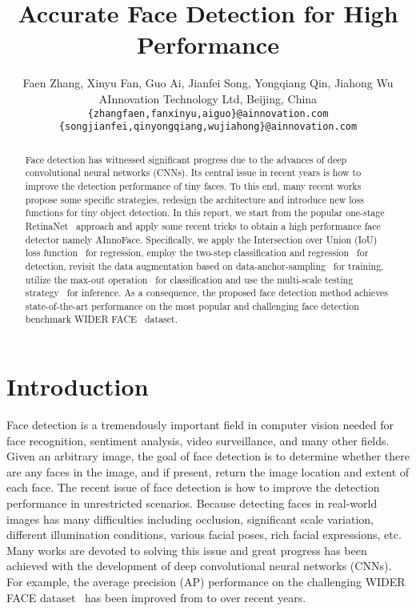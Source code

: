 \documentclass{article} \usepackage{nips13submit_e,times}
\begin{document}
\title{Accurate Face Detection for High Performance}
\author{
  Faen Zhang, Xinyu Fan, Guo Ai, Jianfei Song, Yongqiang Qin, Jiahong Wu\\
  AInnovation Technology Ltd, Beijing, China\\
  \texttt{\{zhangfaen,fanxinyu,aiguo\}@ainnovation.com}\\
  \texttt{\{songjianfei,qinyongqiang,wujiahong\}@ainnovation.com}\\
}
\maketitle

\begin{abstract}
Face detection has witnessed significant progress due to the advances of deep convolutional neural networks (CNNs). Its central issue in recent years is how to improve the detection performance of tiny faces. To this end, many recent works propose some specific strategies, redesign the architecture and introduce new loss functions for tiny object detection. In this report, we start from the popular one-stage RetinaNet~\cite{DBLP:conf/iccv/LinPRK17} approach and apply some recent tricks to obtain a high performance face detector namely AInnoFace. Specifically, we apply the Intersection over Union (IoU) loss function~\cite{DBLP:conf/mm/YuJWCH16} for regression, employ the two-step classification and regression~\cite{DBLP:journals/corr/abs-1809-02693} for detection, revisit the data augmentation based on data-anchor-sampling~\cite{tang2018pyramidbox} for training, utilize the max-out operation~\cite{DBLP:conf/iccv/abs-1708-05237} for classification and use the multi-scale testing strategy~\cite{DBLP:conf/iccv/abs-1708-05237} for inference. As a consequence, the proposed face detection method achieves state-of-the-art performance on the most popular and challenging face detection benchmark WIDER FACE~\cite{DBLP:conf/cvpr/YangLLT16} dataset.
\end{abstract}


\section{Introduction}
Face detection is a tremendously important field in computer vision needed for face recognition, sentiment analysis, video surveillance, and many other fields. Given an arbitrary image, the goal of face detection is to determine whether there are any faces in the image, and if present, return the image location and extent of each face. The recent issue of face detection is how to improve the detection performance in unrestricted scenarios. Because detecting faces in real-world images has many difficulties including occlusion, significant scale variation, different illumination conditions, various facial poses, rich facial expressions, etc. Many works are devoted to solving this issue and great progress has been achieved with the development of deep convolutional neural networks (CNNs). For example, the average precision (AP) performance on the challenging WIDER FACE dataset~\cite{DBLP:conf/cvpr/YangLLT16} has been improved from  to  over recent years.
\end{document}
